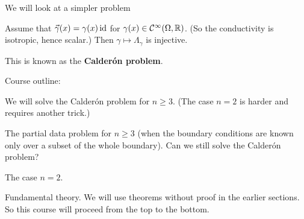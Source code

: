 We will look at a simpler problem

Assume that $\vec\gamma(x) = \gamma(x) \operatorname{id}$ for $\gamma(x) \in \mathcal{C}^\infty(\Omega,\mathbb{R})$.
(So the conductivity is isotropic, hence scalar.)
Then $\gamma \mapsto \Lambda_\gamma$ is injective.

This is known as the \textbf{Calder\'on problem}.

Course outline:

\begin{itm}
  \io
  We will solve the Calder\'on problem for $n \geq 3$.
  (The case $n=2$ is harder and requires another trick.)

  \io
  The partial data problem for $n \geq 3$ (when the boundary conditions are known only over a subset of the whole boundary).
  Can we still solve the Calder\'on problem?

  \io
  The case $n=2$.

  \io
  Fundamental theory.
  We will use theorems without proof in the earlier sections.
  So this course will proceed from the top to the bottom.
\end{itm}
